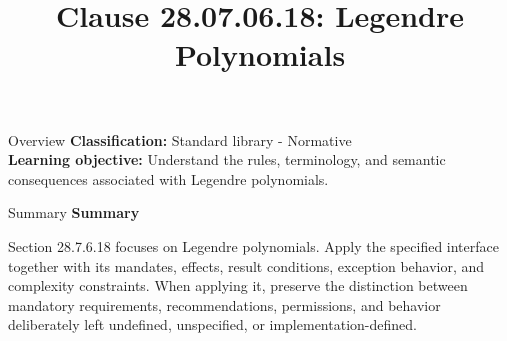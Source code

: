 \documentclass[10pt,letterpaper]{article}
\title{Clause 28.07.06.18: Legendre Polynomials}
\author{}
\date{}
\begin{document}
\maketitle
\begin{CornellOverviewBox}{Overview}
\textbf{Classification:} Standard library - Normative\\[2pt]
\textbf{Learning objective:} Understand the rules, terminology, and semantic consequences associated with Legendre polynomials.
\end{CornellOverviewBox}\begin{CornellSummaryBox}{Summary}
{\sffamily\bfseries\color{Accent} Summary}\par\vspace{3pt}Section 28.7.6.18 focuses on Legendre polynomials. Apply the specified interface together with its mandates, effects, result conditions, exception behavior, and complexity constraints. When applying it, preserve the distinction between mandatory requirements, recommendations, permissions, and behavior deliberately left undefined, unspecified, or implementation-defined.
\end{CornellSummaryBox}
\end{document}

